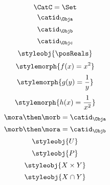 {\begin{forslides}
\begin{equation}
            \label{eq:23}
            \CatC = \Set
        \end{equation}
%
        \begin{equation}
            \label{eq:24}
            \catid_{\Obja}
        \end{equation}
%
        \begin{equation}
            \label{eq:25}
            \catid_{\Objb}
        \end{equation}
%
        \begin{equation}
            \label{eq:26}
            \catid_{\Objc}
        \end{equation}
%
        \begin{equation}
            \label{eq:27}
            \styleobj{\posReals}
        \end{equation}
%
        \begin{equation}
            \label{eq:28}
            \stylemorph{f(x) = x^2}
        \end{equation}
%
        \begin{equation}
            \label{eq:29}
            \stylemorph{g(y) = \frac{1}{y}}
        \end{equation}
%
        \begin{equation}
            \label{eq:30}
            \stylemorph{h(x) = \frac{1}{x^2}}
        \end{equation}
%
        \begin{equation}
            \label{eq:31}
            \mora \then \morb = \catid_\Obja
        \end{equation}
%
        \begin{equation}
            \label{eq:32}
            \morb \then \mora = \catid_\Objb
        \end{equation}
%
        \begin{equation}
            \label{eq:33}
            \styleobj{U}
        \end{equation}
%
        \begin{equation}
            \label{eq:34}
            \styleobj{P}
        \end{equation}
%
        \begin{equation}
            \label{eq:35}
            \styleobj{X \times Y}
        \end{equation}
%
        \begin{equation}
            \label{eq:36}
            \styleobj{X \cap Y}
        \end{equation}
%
        \begin{equation}

\end{equation}
\end{forslides}}
